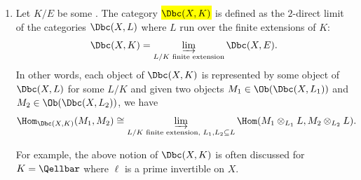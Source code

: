 \begin{definition}
\begin{enumerate}
        For example, the above notion of $\Dbc(X,E)$ is often discussed for $E = \Qell$ where $\ell$ is a prime invertible on $X$. 

        \item Let $K/E$ be some . The category \hl{$\Dbc(X,K)$} is defined as the $2$-direct limit of the categories $\Dbc(X,L)$ where $L$ run over the finite extensions of $K$:
        $$\Dbc(X,K) = \varinjlim_{L/K \text{ finite extension}} \Dbc(X,E).$$
        In other words, each object of $\Dbc(X,K)$ is represented by some object of $\Dbc(X,L)$ for some $L/K$ and given two objects $M_1 \in \Ob (\Dbc(X, L_1))$ and $M_2 \in \Ob(\Dbc(X,L_2))$, we have
        $$\Hom_{\Dbc(X,K)}(M_1, M_2) \cong \varinjlim_{L/K \text{ finite extension, } L_1,L_2 \subseteq L} \Hom(M_1 \otimes_{L_1} L, M_2 \otimes_{L_2} L).$$

        For example, the above notion of $\Dbc(X,K)$ is often discussed for $K = \Qellbar$ where $\ell$ is a prime invertible on $X$. 
    \end{enumerate}


\end{definition}